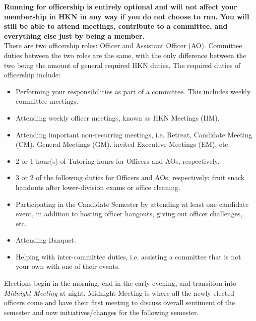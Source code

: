 \documentclass[11pt, article, oneside]{memoir}
\begin{document}
        \textbf{
            Running for officership is entirely optional and will not affect your membership in HKN in any way if you do not choose to run.
            You will still be able to attend meetings, contribute to a committee, and everything else just by being a member.
        } \\

        There are two officership roles: Officer and Assistant Officer (AO).
        Committee duties between the two roles are the same, with the only difference between the two being the amount of general required HKN duties.
        The required duties of officership include:
        \begin{itemize}
            \item
                Performing your responsibilities as part of a committee.
                This includes weekly committee meetings.
            \item
                Attending weekly officer meetings, known as HKN Meetings (HM).
            \item
                Attending important non-recurring meetings, i.e. Retreat, Candidate Meeting (CM), General Meetings (GM), invited Executive Meetings (EM), etc.
            \item
                2 or 1 hour(s) of Tutoring hours for Officers and AOs, respectively.
            \item
                3 or 2 of the following duties for Officers and AOs, respectively: fruit snack handouts after lower-division exams or office cleaning.
            \item
                Participating in the Candidate Semester by attending at least one candidate event, in addition to hosting officer hangouts, giving out officer challenges, etc.
            \item
                Attending Banquet.
            \item
                Helping with inter-committee duties, i.e. assisting a committee that is not your own with one of their events.
        \end{itemize}
        Elections begin in the morning, end in the early evening, and transition into \emph{Midnight Meeting} at night.
        Midnight Meeting is where all the newly-elected officers come and have their first meeting to discuss overall sentiment of the semester and new initiatives/changes for the following semester. \\
\end{document}
